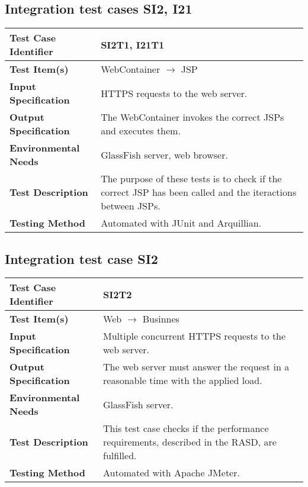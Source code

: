 \vspace{2em}

\subsection {Integration test cases SI2, I21}

\indent

\vspace{1em}

\begin{tabular}{l p{}}
    \hline
    \textbf{Test Case Identifier} & SI2T1, I21T1\\
    \hline
    \textbf{Test Item(s)} & WebContainer $\rightarrow$ JSP \\
    \hline
    \textbf{Input Specification} &  HTTPS requests to the web server. \\
    \hline
    \textbf{Output Specification} &  The WebContainer invokes the correct JSPs and executes them.  \\
    \hline
    \textbf{Environmental Needs} & GlassFish server, web browser. \\
    \hline
    \textbf{Test Description} & The purpose of these tests is to check if the correct JSP has been called and the iteractions between JSPs.  \\
    \hline
    \textbf{Testing Method} & Automated with JUnit and Arquillian. \\
    \hline
\end{tabular}

\vspace{2em}

\subsection {Integration test case SI2}

\indent

\vspace{1em}

\begin{tabular}{l p{}}
    \hline
    \textbf{Test Case Identifier} & SI2T2\\
    \hline
    \textbf{Test Item(s)} & Web $\rightarrow$ Businnes \\
    \hline
    \textbf{Input Specification} &  Multiple concurrent HTTPS requests to the web server. \\
    \hline
    \textbf{Output Specification} & The web server must answer the request in a reasonable time with the applied load. \\
    \hline
    \textbf{Environmental Needs} & GlassFish server. \\
    \hline
    \textbf{Test Description} & This test case checks if the performance requirements, described in the RASD, are fulfilled.  \\
    \hline
    \textbf{Testing Method} & Automated with Apache JMeter. \\
    \hline
\end{tabular}


